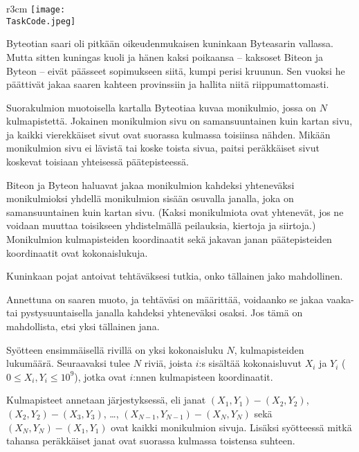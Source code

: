 \documentclass{boi2014-fi}
\renewcommand{\TaskCode}{demarcation}
\begin{document}
    \begin{wrapfigure}{r}{3cm}
        \vspace{-24pt}
        \texttt{[image: \\TaskCode.jpeg]}
    \end{wrapfigure}

    Byteotian saari oli pitkään oikeudenmukaisen kuninkaan Byteasarin vallassa.
    Mutta sitten kuningas kuoli ja hänen kaksi poikaansa --
    kaksoset Biteon ja Byteon -- eivät päässeet sopimukseen siitä,
    kumpi perisi kruunun.
    Sen vuoksi he päättivät jakaa saaren kahteen provinssiin
    ja hallita niitä riippumattomasti.

    Suorakulmion muotoisella kartalla Byteotiaa kuvaa monikulmio,
    jossa on $N$ kulmapistettä.
    Jokainen monikulmion sivu on samansuuntainen kuin kartan sivu,
    ja kaikki vierekkäiset sivut ovat suorassa kulmassa toisiinsa nähden.
    Mikään monikulmion sivu ei lävistä tai koske toista sivua, paitsi
    peräkkäiset sivut koskevat toisiaan yhteisessä päätepisteessä.
    
    Biteon ja Byteon haluavat jakaa monikulmion kahdeksi yhteneväksi monikulmioksi
    yhdellä monikulmion sisään osuvalla janalla, joka on samansuuntainen
    kuin kartan sivu.
    (Kaksi monikulmiota ovat yhtenevät, jos ne voidaan muuttaa toisikseen
     yhdistelmällä peilauksia, kiertoja ja siirtoja.)
    Monikulmion kulmapisteiden koordinaatit sekä jakavan janan
    pääte\-pis\-tei\-den koordinaatit ovat kokonaislukuja.

    Kuninkaan pojat antoivat tehtäväksesi tutkia,
    onko tällainen jako mahdollinen.

    \Task
    Annettuna on saaren muoto,
    ja tehtäväsi on määrittää, voidaanko se jakaa
    vaaka- tai pystysuuntaisella janalla kahdeksi yhteneväksi osaksi.
    Jos tämä on mahdollista, etsi yksi tällainen jana.
    
    \Input
    Syötteen ensimmäisellä rivillä on yksi kokonaisluku $N$,
    kulmapisteiden lukumäärä.
    Seuraavaksi tulee $N$ riviä, joista $i$:s sisältää kokonaisluvut
    $X_i$ ja $Y_i$ ($0 \le X_i, Y_i \le 10^9$), jotka ovat $i$:nnen kulmapisteen
    koordinaatit.
    
    Kulmapisteet annetaan järjestyksessä, eli
    janat $(X_1,Y_1) - (X_2,Y_2)$, $(X_2,Y_2) - (X_3,Y_3)$, \ldots, $(X_{N-1},Y_{N-1}) - (X_N,Y_N)$ sekä
    $(X_N,Y_N) - (X_1,Y_1)$ ovat kaikki monikulmion sivuja.
    Lisäksi syötteessä mitkä tahansa peräkkäiset janat ovat suorassa
    kulmassa toistensa suhteen.
\end{document}
